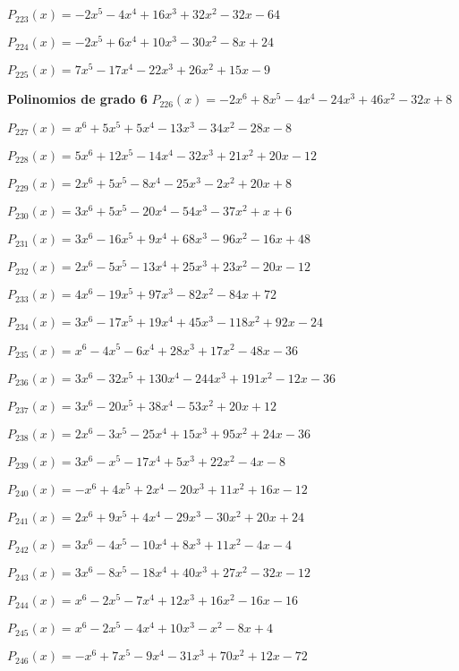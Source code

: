 \subitem $P_{223}(x) = -2x^5 - 4x^4 + 16x^3 + 32x^2 - 32x - 64$

\subitem $P_{224}(x) = -2x^5 + 6x^4 + 10x^3 - 30x^2 - 8x + 24$

\subitem $P_{225}(x) = 7x^5 - 17x^4 - 22x^3 + 26x^2 + 15x - 9$

\textbf{Polinomios de grado 6} 
\subitem $P_{226}(x) = -2x^6 + 8x^5 - 4x^4 - 24x^3 + 46x^2 - 32x + 8$

\subitem $P_{227}(x) = x^6 + 5x^5 + 5x^4 - 13x^3 - 34x^2 - 28x - 8$

\subitem $P_{228}(x) = 5x^6 + 12x^5 - 14x^4 - 32x^3 + 21x^2 + 20x - 12$

\subitem $P_{229}(x) = 2x^6 + 5x^5 - 8x^4 - 25x^3 - 2x^2 + 20x + 8$

\subitem $P_{230}(x) = 3x^6 + 5x^5 - 20x^4 - 54x^3 - 37x^2 + x + 6$

\subitem $P_{231}(x) = 3x^6 - 16x^5 + 9x^4 + 68x^3 - 96x^2 - 16x + 48$

\subitem $P_{232}(x) = 2x^6 - 5x^5 - 13x^4 + 25x^3 + 23x^2 - 20x - 12$

\subitem $P_{233}(x) = 4x^6 - 19x^5 + 97x^3 - 82x^2 - 84x + 72$

\subitem $P_{234}(x) = 3x^6 - 17x^5 + 19x^4 + 45x^3 - 118x^2 + 92x - 24$

\subitem $P_{235}(x) = x^6 - 4x^5 - 6x^4 + 28x^3 + 17x^2 - 48x - 36$

\subitem $P_{236}(x) = 3x^6 - 32x^5 + 130x^4 - 244x^3 + 191x^2 - 12x - 36$

\subitem $P_{237}(x) = 3x^6 - 20x^5 + 38x^4 - 53x^2 + 20x + 12$

\subitem $P_{238}(x) = 2x^6 - 3x^5 - 25x^4 + 15x^3 + 95x^2 + 24x - 36$

\subitem $P_{239}(x) = 3x^6 - x^5 - 17x^4 + 5x^3 + 22x^2 - 4x - 8$

\subitem $P_{240}(x) = -x^6 + 4x^5 + 2x^4 - 20x^3 + 11x^2 + 16x - 12$

\subitem $P_{241}(x) = 2x^6 + 9x^5 + 4x^4 - 29x^3 - 30x^2 + 20x + 24$

\subitem $P_{242}(x) = 3x^6 - 4x^5 - 10x^4 + 8x^3 + 11x^2 - 4x - 4$

\subitem $P_{243}(x) = 3x^6 - 8x^5 - 18x^4 + 40x^3 + 27x^2 - 32x - 12$

\subitem $P_{244}(x) = x^6 - 2x^5 - 7x^4 + 12x^3 + 16x^2 - 16x - 16$

\subitem $P_{245}(x) = x^6 - 2x^5 - 4x^4 + 10x^3 - x^2 - 8x + 4$

\subitem $P_{246}(x) = -x^6 + 7x^5 - 9x^4 - 31x^3 + 70x^2 + 12x - 72$

